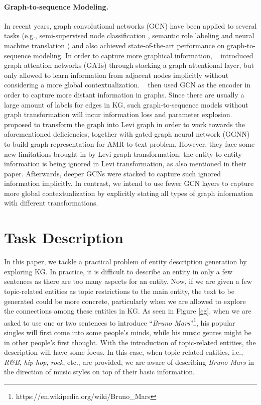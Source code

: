 \documentclass[11pt,a4paper]{article}
\begin{document}
\paragraph{Graph-to-sequence Modeling.}
In recent years, graph convolutional networks (GCN) have been applied to several tasks (e.g., semi-supervised node classification \citep{kipf2016semi}, semantic role labeling \citep{marcheggiani2017encoding} and neural machine translation \citep{bastings2017graph}) and also achieved state-of-the-art performance on graph-to-sequence modeling.
In order to capture more graphical information, ~\citet{velivckovic2017graph} introduced graph attention networks (GATs) through stacking a graph attentional layer, but only allowed to learn information from adjacent nodes implicitly without considering a more global contextualization.
~\citet{marcheggiani2017encoding} then used GCN as the encoder in order to capture more distant information in graphs.
Since there are usually a large amount of labels for edges in KG, such graph-to-sequence models without graph transformation will incur information loss and parameter explosion.
\citet{beck2018graph} proposed to transform the graph into Levi graph in order to work towards the aforementioned deficiencies, together with gated graph neural network (GGNN) to build graph representation for AMR-to-text problem. 
However, they face some new limitations brought in by Levi graph transformation: the entity-to-entity information is being ignored in Levi transformation, as also mentioned in their paper. Afterwards, deeper GCNs were stacked \cite{guo2019densely} to capture such ignored information implicitly.
In contrast, we intend to use fewer GCN layers to capture more global contextualization by explicitly stating all types of graph information with different transformations.



\section{Task Description}
In this paper, we tackle a practical problem of entity description generation by exploring KG.
In practice, it is difficult to describe an entity in only a few sentences as there are too many aspects for an entity.
Now, if we are given a few topic-related entities as topic restrictions to the main entity, the text to be generated could be more concrete, particularly when we are allowed to explore the connections among these entities in KG.
As seen in Figure \ref{eg}, when we are asked to use one or two sentences to introduce ``\textit{Bruno Mars}''\footnote{https://en.wikipedia.org/wiki/Bruno\_Mars}, his popular singles will first come into some people's minds, while his music genres might be in other people's first thought.
With the introduction of topic-related entities, the description will have some focus.
In this case, when topic-related entities, i.e., \textit{R\&B}, \textit{hip hop}, \textit{rock}, etc., are provided, we are aware of describing \textit{Bruno Mars} in the direction of music styles on top of their basic information.
\end{document}
